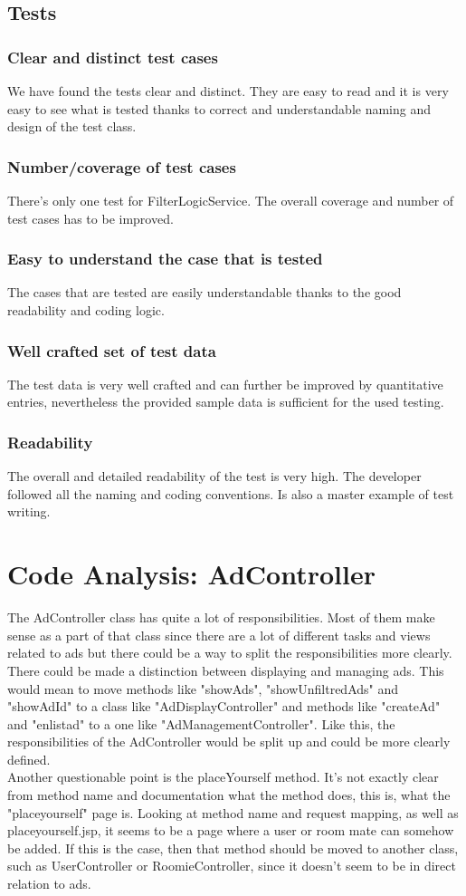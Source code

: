 \documentclass{scrreprt}
\begin{document}
\section{Tests}
\subsection{Clear and distinct test cases}
We have found the tests clear and distinct. They are easy to read and it is very easy to see what is tested thanks to 
correct and understandable naming and design of the test class.
\subsection{Number/coverage of test cases}
There's only one test for FilterLogicService. The overall coverage and number of test cases has to be improved.
\subsection{Easy to understand the case that is tested}
The cases that are tested are easily understandable thanks to the good readability and coding logic.
\subsection{Well crafted set of test data}
The test data is very well crafted and can further be improved by quantitative entries, nevertheless the provided sample data is sufficient for the used testing.
\subsection{Readability}
The overall and detailed readability of the test is very high. The developer followed all the naming and coding conventions. Is also a master example of test writing.

\chapter{Code Analysis: AdController}
The AdController class has quite a lot of responsibilities. Most of them make sense as a part of that class since there are a lot of different tasks and views related to ads but there could be a way to split the responsibilities more clearly. There could be made a distinction between displaying and managing ads. This would mean to move methods like "showAds", "showUnfiltredAds" and "showAdId" to a class like "AdDisplayController" and methods like "createAd" and "enlistad" to a one like "AdManagementController". Like this, the responsibilities of the AdController would be split up and could be more clearly defined. \\

Another questionable point is the placeYourself method. It's not exactly clear from method name and documentation what the method does, this is, what the "placeyourself" page is. Looking at method name and request mapping, as well as placeyourself.jsp, it seems to be a page where a user or room mate can somehow be added. If this is the case, then that method should be moved to another class, such as UserController or RoomieController, since it doesn't seem to be in direct relation to ads.
\end{document}
